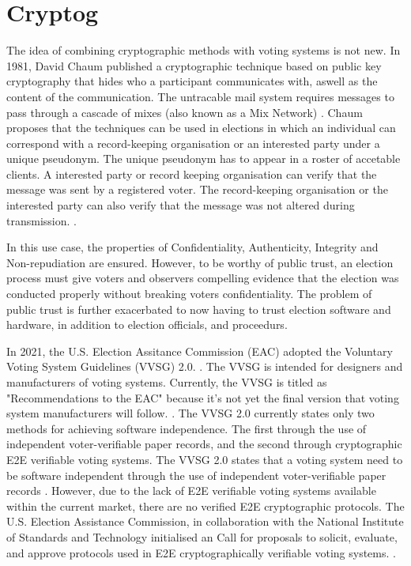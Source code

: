 \section{Cryptog}
The idea of combining cryptographic methods with voting systems is not new. In 1981, David Chaum published a cryptographic technique based on public key cryptography that hides who a participant communicates with, aswell as the content of the communication. The untracable mail system requires messages to pass through a cascade of mixes (also known as a Mix Network) \cite[86]{chaum}. Chaum proposes that the techniques can be used in elections in which an individual can correspond with a record-keeping organisation or an interested party under a unique pseudonym. The unique pseudonym has to appear in a roster of accetable clients. A interested party or record keeping organisation can verify that the message was sent by a registered voter. The record-keeping organisation or the interested party can also verify that the message was not altered during transmission. \cite[84]{chaum}. 

In this use case, the properties of Confidentiality, Authenticity, Integrity and Non-repudiation are ensured. However, to be worthy of public trust, an election process must give voters and observers compelling evidence that the election was conducted properly without breaking voters confidentiality. The problem of public trust is further exacerbated to now having to trust election software and hardware, in addition to election officials, and proceedurs.

In 2021, the U.S. Election Assitance Commission (EAC) adopted the Voluntary Voting System Guidelines (VVSG) 2.0. \cite{eac-pressrelease}. The VVSG is intended for designers and manufacturers of voting systems. Currently, the VVSG is titled as "Recommendations to the EAC" because it's not yet the final version that voting system manufacturers will follow.
\cite{https://www.nist.gov/itl/voting/vvsg-introduction}. The VVSG 2.0 currently states only two methods for achieving software independence. The first through the use of independent voter-verifiable paper records, and the second through cryptographic E2E verifiable voting systems. The VVSG 2.0 states that a voting system need to be software independent through the use of independent voter-verifiable paper records
\cite[181]{https://www.eac.gov/sites/default/files/TestingCertification/Voluntary_Voting_System_Guidelines_Version_2_0.pdf}. However, due to the lack of E2E verifiable voting systems available within the current market, there are no verified E2E cryptographic protocols.\cite[199]{https://www.eac.gov/sites/default/files/TestingCertification/Voluntary_Voting_System_Guidelines_Version_2_0.pdf} The U.S. Election Assistance Commission, in collaboration with the National Institute of Standards and Technology initialised an Call for proposals to solicit, evaluate, and approve protocols used in E2E cryptographically verifiable voting systems. \cite{https://www.eac.gov/voting-equipment/end-end-e2e-protocol-evaluation-process}. 

